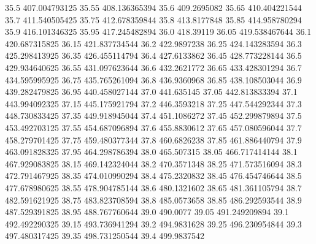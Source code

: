            35.5    407.004793125
          35.55    408.136365394
           35.6      409.2695082
          35.65    410.404221544
           35.7    411.540505425
          35.75    412.678359844
           35.8      413.8177848
          35.85    414.958780294
           35.9    416.101346325
          35.95    417.245482894
           36.0        418.39119
          36.05    419.538467644
           36.1    420.687315825
          36.15    421.837734544
           36.2      422.9897238
          36.25    424.143283594
           36.3    425.298413925
          36.35    426.455114794
           36.4      427.6133862
          36.45    428.773228144
           36.5    429.934640625
          36.55    431.097623644
           36.6      432.2621772
          36.65    433.428301294
           36.7    434.595995925
          36.75    435.765261094
           36.8      436.9360968
          36.85    438.108503044
           36.9    439.282479825
          36.95    440.458027144
           37.0       441.635145
          37.05    442.813833394
           37.1    443.994092325
          37.15    445.175921794
           37.2      446.3593218
          37.25    447.544292344
           37.3    448.730833425
          37.35    449.918945044
           37.4      451.1086272
          37.45    452.299879894
           37.5    453.492703125
          37.55    454.687096894
           37.6      455.8830612
          37.65    457.080596044
           37.7    458.279701425
          37.75    459.480377344
           37.8      460.6826238
          37.85    461.886440794
           37.9    463.091828325
          37.95    464.298786394
           38.0       465.507315
          38.05    466.717414144
           38.1    467.929083825
          38.15    469.142324044
           38.2      470.3571348
          38.25    471.573516094
           38.3    472.791467925
          38.35    474.010990294
           38.4      475.2320832
          38.45    476.454746644
           38.5    477.678980625
          38.55    478.904785144
           38.6      480.1321602
          38.65    481.361105794
           38.7    482.591621925
          38.75    483.823708594
           38.8      485.0573658
          38.85    486.292593544
           38.9    487.529391825
          38.95    488.767760644
           39.0         490.0077
          39.05    491.249209894
           39.1    492.492290325
          39.15    493.736941294
           39.2      494.9831628
          39.25    496.230954844
           39.3    497.480317425
          39.35    498.731250544
           39.4      499.9837542
